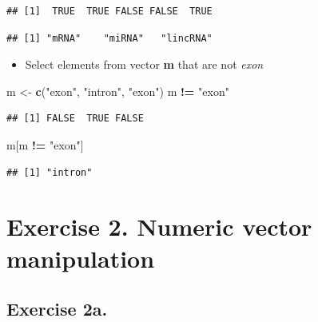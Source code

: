 \documentclass[]{book}
\newenvironment{Shaded}{\begin{snugshade}}{\end{snugshade}}
\newcommand{\KeywordTok}[1]{\textcolor[rgb]{0.13,0.29,0.53}{\textbf{#1}}}
\newcommand{\NormalTok}[1]{#1}
\newcommand{\OperatorTok}[1]{\textcolor[rgb]{0.81,0.36,0.00}{\textbf{#1}}}
\newcommand{\StringTok}[1]{\textcolor[rgb]{0.31,0.60,0.02}{#1}}
\providecommand{\tightlist}{%
  \setlength{\itemsep}{0pt}\setlength{\parskip}{0pt}}
\begin{document}
\begin{verbatim}
## [1]  TRUE  TRUE FALSE FALSE  TRUE
\end{verbatim}

\begin{Shaded}
\end{Shaded}

\begin{verbatim}
## [1] "mRNA"    "miRNA"   "lincRNA"
\end{verbatim}

\begin{itemize}
\tightlist
\item
  Select elements from vector \textbf{m} that are not \emph{exon}
\end{itemize}

\begin{Shaded}
\begin{Highlighting}[]
\NormalTok{m <-}\StringTok{ }\KeywordTok{c}\NormalTok{(}\StringTok{"exon"}\NormalTok{, }\StringTok{"intron"}\NormalTok{, }\StringTok{"exon"}\NormalTok{)}
\NormalTok{m }\OperatorTok{!=}\StringTok{ "exon"}
\end{Highlighting}
\end{Shaded}

\begin{verbatim}
## [1] FALSE  TRUE FALSE
\end{verbatim}

\begin{Shaded}
\begin{Highlighting}[]
\NormalTok{m[m }\OperatorTok{!=}\StringTok{ "exon"}\NormalTok{]}
\end{Highlighting}
\end{Shaded}

\begin{verbatim}
## [1] "intron"
\end{verbatim}

\hypertarget{exercise-2.-numeric-vector-manipulation}{%
\section{Exercise 2. Numeric vector manipulation}\label{exercise-2.-numeric-vector-manipulation}}

\hypertarget{exercise-2a.}{%
\subsection{Exercise 2a.}\label{exercise-2a.}}
\end{document}
